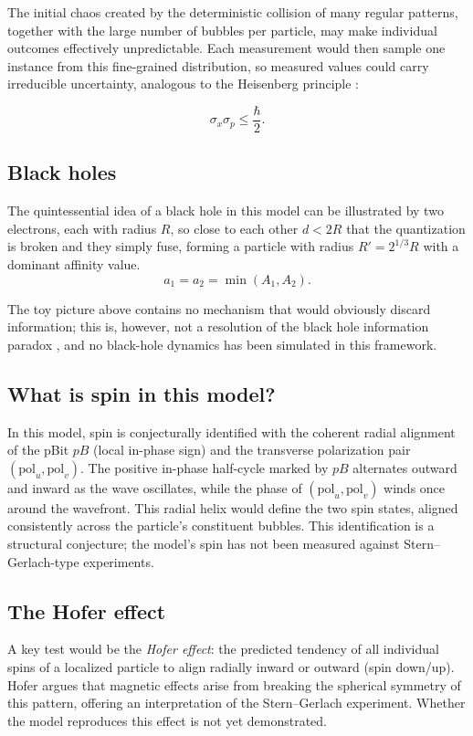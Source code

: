 \documentclass{ijuc}
\begin{document}
The initial chaos created by the deterministic collision of many regular patterns, together with the large number of bubbles per particle, may make individual outcomes effectively unpredictable. Each measurement would then sample one instance from this fine-grained distribution, so measured values could carry irreducible uncertainty, analogous to the Heisenberg principle \cite{Heisenberg1927}:

\[
\sigma_x \sigma_p \leq \frac{\hbar}{2}.
\]

\subsection{Black holes}
The quintessential idea of a black hole in this model can be illustrated by two electrons, each with radius $R$, so close to each other $d<2R$ that the quantization is broken and they simply fuse, forming a particle with radius $R'=2^{1/3}R$ with a dominant affinity value. 
\[
a_1 = a_2 = \min(A_1,A_2).
\]

The toy picture above contains no mechanism that would obviously discard information; this is, however, not a resolution of the black hole information paradox \cite{hawking1976breakdown,harlow2016jerusalem}, and no black-hole dynamics has been simulated in this framework.

\subsection{What is spin in this model?}
In this model, spin is conjecturally identified with the coherent radial alignment of the pBit $pB$ (local in-phase sign) and the transverse polarization pair $(\mathrm{pol}_u,\mathrm{pol}_v)$. The positive in-phase half-cycle marked by $pB$ alternates outward and inward as the wave oscillates, while the phase of $(\mathrm{pol}_u,\mathrm{pol}_v)$ winds once around the wavefront. This radial helix would define the two spin states, aligned consistently across the particle's constituent bubbles. This identification is a structural conjecture; the model's spin has not been measured against Stern–Gerlach-type experiments.

\subsection{The Hofer effect}\label{subsec:hofer}

A key test would be the \emph{Hofer effect}: the predicted tendency of all individual spins of a localized particle to align radially inward or outward (spin down/up). Hofer \cite{hofer} argues that magnetic effects arise from breaking the spherical symmetry of this pattern, offering an interpretation of the Stern–Gerlach experiment. Whether the model reproduces this effect is not yet demonstrated.
\end{document}
